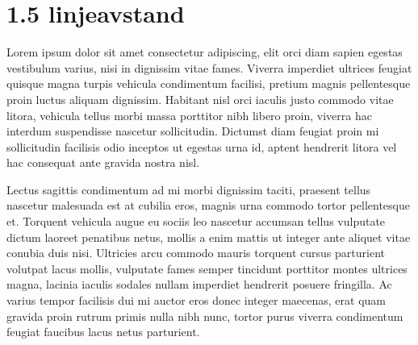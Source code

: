 \documentclass[UKenglish]{DUO/ifimaster}
\begin{document}
\frontmatter{}

\mainmatter{}

\section*{1.5 linjeavstand}
Lorem ipsum dolor sit amet consectetur adipiscing, elit orci diam sapien egestas vestibulum varius, nisi in dignissim vitae fames. Viverra imperdiet ultrices feugiat quisque magna turpis vehicula condimentum facilisi, pretium magnis pellentesque proin luctus aliquam dignissim. Habitant nisl orci iaculis justo commodo vitae litora, vehicula tellus morbi massa porttitor nibh libero proin, viverra hac interdum suspendisse nascetur sollicitudin. Dictumst diam feugiat proin mi sollicitudin facilisis odio inceptos ut egestas urna id, aptent hendrerit litora vel hac consequat ante gravida nostra nisl.

Lectus sagittis condimentum ad mi morbi dignissim taciti, praesent tellus nascetur malesuada est at cubilia eros, magnis urna commodo tortor pellentesque et. Torquent vehicula augue eu sociis leo nascetur accumsan tellus vulputate dictum laoreet penatibus netus, mollis a enim mattis ut integer ante aliquet vitae conubia duis nisi. Ultricies arcu commodo mauris torquent cursus parturient volutpat lacus mollis, vulputate fames semper tincidunt porttitor montes ultrices magna, lacinia iaculis sodales nullam imperdiet hendrerit posuere fringilla. Ac varius tempor facilisis dui mi auctor eros donec integer maecenas, erat quam gravida proin rutrum primis nulla nibh nunc, tortor purus viverra condimentum feugiat faucibus lacus netus parturient.


\backmatter{}
\end{document}
